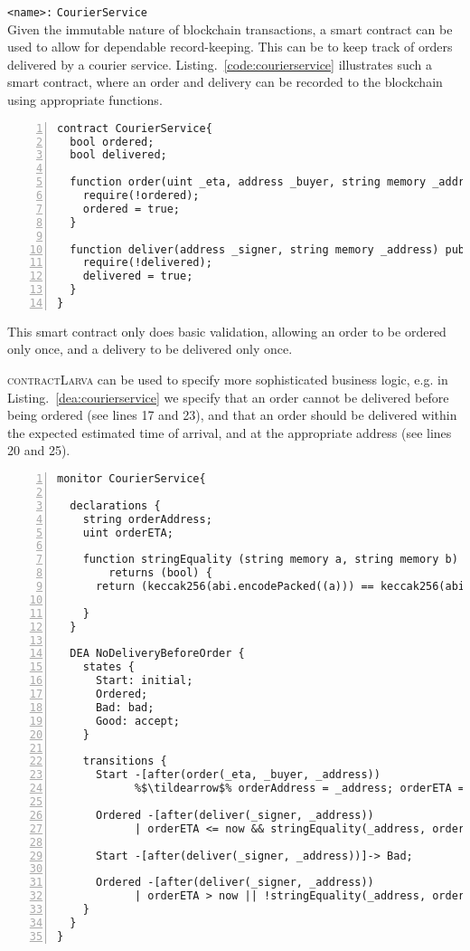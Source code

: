 \documentclass{article}
\newcommand{\contractlarva}{\textsc{contractLarva}\xspace}
\newcommand{\tildearrow}{{\raise.37ex\hbox{$\scriptstyle\mathtt{\sim}$}}\hspace{-0.08cm}>\xspace}
\begin{document}
    \texttt{<name>:} \verb+CourierService+\\
   
    Given the immutable nature of blockchain transactions, a smart contract can be used to allow for dependable record-keeping. This can be to keep track of orders delivered by a courier service. Listing.~\ref{code:courierservice} illustrates such a smart contract, where an order and delivery can be recorded to the blockchain using appropriate functions. 
   
    \small\begin{lstlisting}[language=Solidity,basicstyle=\scriptsize,numbers=left,numbersep=2pt,xleftmargin=0.3cm,label={code:courierservice}]
contract CourierService{
  bool ordered;
  bool delivered;
  
  function order(uint _eta, address _buyer, string memory _address) public{
    require(!ordered);
    ordered = true;
  }
  
  function deliver(address _signer, string memory _address) public{
    require(!delivered);
    delivered = true;
  }
}
    \end{lstlisting}\normalsize
  
  This smart contract only does basic validation, allowing an order to be ordered only once, and a delivery to be delivered only once. 
  
  \contractlarva can be used to specify more sophisticated business logic, e.g. in Listing.~\ref{dea:courierservice} we specify that an order cannot be delivered before being ordered (see lines 17 and 23), and that an order should be delivered within the expected estimated time of arrival, and at the appropriate address (see lines 20 and 25).

  
  \small\begin{lstlisting}[language=DEA,basicstyle=\scriptsize,numbers=left,numbersep=2pt,xleftmargin=0.3cm,escapechar=\%,label={dea:courierservice}]
monitor CourierService{

  declarations {
    string orderAddress;
    uint orderETA;
    
    function stringEquality (string memory a, string memory b) public view 
        returns (bool) {
      return (keccak256(abi.encodePacked((a))) == keccak256(abi.encodePacked((b))) );
    
    }
  }
  
  DEA NoDeliveryBeforeOrder {
    states {
      Start: initial;
      Ordered;
      Bad: bad;
      Good: accept;
    }

    transitions {
      Start -[after(order(_eta, _buyer, _address)) 
            %$\tildearrow$% orderAddress = _address; orderETA = _eta;]-> Ordered;
            
      Ordered -[after(deliver(_signer, _address)) 
            | orderETA <= now && stringEquality(_address, orderAddress)]-> Good;
      
      Start -[after(deliver(_signer, _address))]-> Bad;
      
      Ordered -[after(deliver(_signer, _address)) 
            | orderETA > now || !stringEquality(_address, orderAddress)]-> Bad;
    }
  }
}
  \end{lstlisting}\normalsize
  
\end{document}
